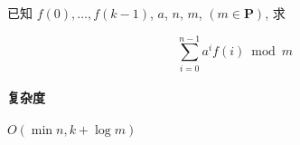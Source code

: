 已知 \(f(0),\dots,f(k-1)\), \(a\), \(n\), \(m\), \((m\in\mathbf{P})\), 求

\[
    \sum_{i=0}^{n-1} a^i f(i)\bmod{m}
\]

\paragraph{复杂度}

\(O(\min{n,k}+\log m)\)